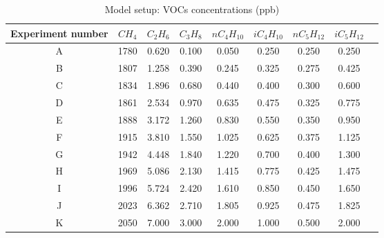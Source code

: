\documentclass[11pt,a4paper]{article}
\begin{document}
\begin{table} %
\caption{Model setup: VOCs concentrations (ppb)}\label{tab:setupVOCs}
\centering
\begin{tabular}{ccccccccc}
\hline
Experiment number & $CH_4$ & $C_2H_6$ & $C_3H_8$ & $nC_4H_{10}$ & $iC_4H_{10}$ & $nC_5H_{12}$ & $iC_5H_{12}$ \\
\hline
A  & 1780 &	0.620 &	0.100 &	0.050 &	0.250 &	0.250 &	0.250 \\
B  & 1807 &	1.258 &	0.390 &	0.245 &	0.325 &	0.275 &	0.425 \\
C  & 1834 &	1.896 &	0.680 &	0.440 &	0.400 &	0.300 &	0.600 \\
D  & 1861 &	2.534 &	0.970 &	0.635 &	0.475 &	0.325 &	0.775 \\
E  & 1888 &	3.172 &	1.260 &	0.830 &	0.550 &	0.350 &	0.950 \\
F  & 1915 &	3.810 &	1.550 &	1.025 &	0.625 &	0.375 &	1.125 \\
G  & 1942 &	4.448 &	1.840 &	1.220 &	0.700 &	0.400 &	1.300 \\
H  & 1969 &	5.086 &	2.130 &	1.415 &	0.775 &	0.425 &	1.475 \\
I  & 1996 &	5.724 &	2.420 &	1.610 &	0.850 &	0.450 &	1.650 \\
J  & 2023 &	6.362 &	2.710 &	1.805 &	0.925 &	0.475 &	1.825 \\
K  & 2050 &	7.000 &	3.000 &	2.000 &	1.000 &	0.500 &	2.000 \\
\hline
\end{tabular}
\end{table}
\end{document}
